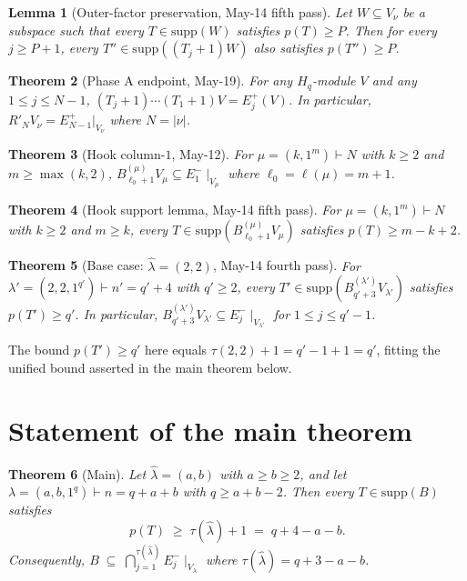 \documentclass[11pt]{article}
\newtheorem{theorem}{Theorem}
\newtheorem{lemma}[theorem]{Lemma}
\theoremstyle{definition}
\newcommand{\Hq}{H_q}
\newcommand{\Vlam}{V_\lambda}
\newcommand{\hatl}{\widehat\lambda}
\newcommand{\supp}{\mathrm{supp}}
\newcommand{\Rp}{{R'}}
\begin{document}
\begin{lemma}[Outer-factor preservation, May-14 fifth pass]\label{lem:outer-preserve}
Let $W \subseteq V_\nu$ be a subspace such that every $T \in \supp(W)$
satisfies $p(T) \ge P$.  Then for every $j \ge P + 1$,
every $T'' \in \supp((T_j{+}1) W)$ also satisfies $p(T'') \ge P$.
\end{lemma}

\begin{theorem}[Phase A endpoint, May-19]\label{thm:phaseA}
For any $\Hq$-module $V$ and any $1 \le j \le N-1$,
$(T_j+1)\cdots(T_1+1) V = E_j^+(V)$.  In particular,
$\Rp_N V_\nu = E_{N-1}^+|_{V_\nu}$ where $N = |\nu|$.
\end{theorem}

\begin{theorem}[Hook column-$1$, May-12]\label{thm:hook-E1minus}
For $\mu = (k, 1^m) \vdash N$ with $k \ge 2$ and $m \ge \max(k, 2)$,
$B^{(\mu)}_{\ell_0+1} V_\mu \subseteq E_1^-\!\mid_{V_\mu}$ where
$\ell_0 = \ell(\mu) = m + 1$.
\end{theorem}

\begin{theorem}[Hook support lemma, May-14 fifth pass]\label{thm:hook-support}
For $\mu = (k, 1^m) \vdash N$ with $k \ge 2$ and $m \ge k$, every
$T \in \supp(B^{(\mu)}_{\ell_0+1} V_\mu)$ satisfies
$p(T) \ge m - k + 2$.
\end{theorem}

\begin{theorem}[Base case: $\hatl = (2, 2)$, May-14 fourth pass]\label{thm:22-base}
For $\lambda' = (2, 2, 1^{q'}) \vdash n' = q' + 4$ with $q' \ge 2$,
every $T' \in \supp(B^{(\lambda')}_{q'+3} V_{\lambda'})$ satisfies
$p(T') \ge q'$.  In particular,
$B^{(\lambda')}_{q'+3} V_{\lambda'} \subseteq E_j^-\!\mid_{V_{\lambda'}}$
for $1 \le j \le q' - 1$.
\end{theorem}

\noindent The bound $p(T') \ge q'$ here equals $\tau(2, 2) + 1 = q' - 1 + 1 = q'$,
fitting the unified bound asserted in the main theorem below.

\section{Statement of the main theorem}\label{sec:statement}

\begin{theorem}[Main]\label{thm:main}
Let $\hatl = (a, b)$ with $a \ge b \ge 2$, and let $\lambda = (a, b, 1^q)
\vdash n = q + a + b$ with $q \ge a + b - 2$.  Then every
$T \in \supp(B)$ satisfies
\begin{equation}\label{eq:main-prefix}
   p(T) \;\ge\; \tau(\hatl) + 1
   \;=\; q + 4 - a - b.
\end{equation}
Consequently,
$B \;\subseteq\; \bigcap_{j=1}^{\tau(\hatl)} E_j^-\!\mid_{\Vlam}$
where $\tau(\hatl) = q + 3 - a - b$.
\end{theorem}
\end{document}
